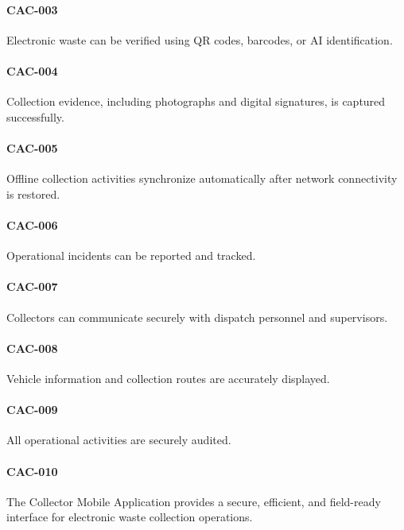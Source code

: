 \paragraph{CAC-003}

Electronic waste can be verified using QR codes, barcodes, or AI
identification.

\paragraph{CAC-004}

Collection evidence, including photographs and digital signatures, is
captured successfully.

\paragraph{CAC-005}

Offline collection activities synchronize automatically after network
connectivity is restored.

\paragraph{CAC-006}

Operational incidents can be reported and tracked.

\paragraph{CAC-007}

Collectors can communicate securely with dispatch personnel and
supervisors.

\paragraph{CAC-008}

Vehicle information and collection routes are accurately displayed.

\paragraph{CAC-009}

All operational activities are securely audited.

\paragraph{CAC-010}

The Collector Mobile Application provides a secure, efficient, and
field-ready interface for electronic waste collection operations.

